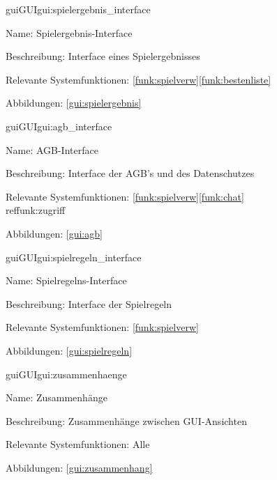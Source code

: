 \begin{description}[leftmargin=5em, style=sameline]	
	\begin{lhp}{gui}{GUI}{gui:spielergebnis_interface}
		\item[Name:]Spielergebnis-Interface
		\item[Beschreibung:] Interface eines Spielergebnisses
		\item[Relevante Systemfunktionen:] \ref{funk:spielverw}\ref{funk:bestenliste}
		\item[Abbildungen:] \ref{gui:spielergebnis}
	\end{lhp}
\end{description}

\begin{description}[leftmargin=5em, style=sameline]	
	\begin{lhp}{gui}{GUI}{gui:agb_interface}
		\item[Name:]AGB-Interface
		\item[Beschreibung:] Interface der AGB's und des Datenschutzes
		\item[Relevante Systemfunktionen:] \ref{funk:spielverw}\ref{funk:chat}\\ref{funk:zugriff}
		\item[Abbildungen:] \ref{gui:agb}
	\end{lhp}
\end{description}

\begin{description}[leftmargin=5em, style=sameline]	
	\begin{lhp}{gui}{GUI}{gui:spielregeln_interface}
		\item[Name:]Spielregelns-Interface
		\item[Beschreibung:] Interface der Spielregeln
		\item[Relevante Systemfunktionen:] \ref{funk:spielverw}
		\item[Abbildungen:] \ref{gui:spielregeln}
	\end{lhp}
\end{description}

\begin{description}[leftmargin=5em, style=sameline]	
	\begin{lhp}{gui}{GUI}{gui:zusammenhaenge}
		\item[Name:] Zusammenhänge
		\item[Beschreibung:] Zusammenhänge zwischen GUI-Ansichten
		\item[Relevante Systemfunktionen:] Alle
		\item[Abbildungen:] \ref{gui:zusammenhang}
	\end{lhp}
\end{description}


